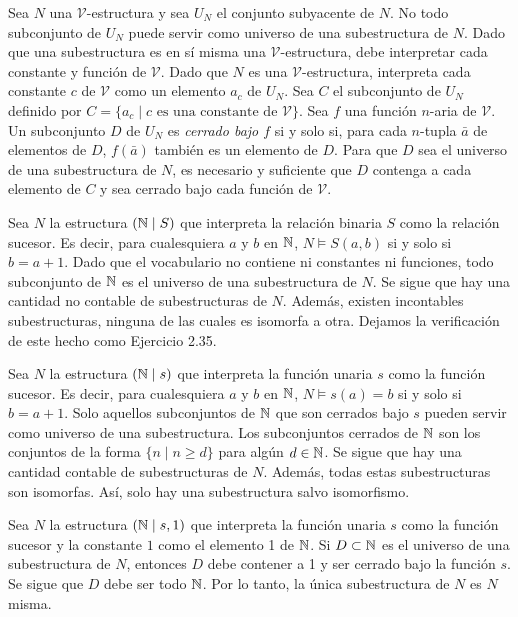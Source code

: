 \documentclass[12pt,a4paper]{book}
\newcommand{\VV}{\mathcal{V}}
\begin{document}
    Sea $N$ una $\VV$-estructura y sea $U_{N}$ el conjunto subyacente de $N$. No todo subconjunto de $U_{N}$ puede servir
    como universo de una subestructura de $N$. Dado que una subestructura es en sí misma una $\VV$-estructura, debe
    interpretar cada constante y función de $\VV$. Dado que $N$ es una $\VV$-estructura, interpreta cada constante $c$ de
    $\VV$ como un elemento $a_{c}$ de $U_{N}$. Sea $C$ el subconjunto de $U_{N}$ definido por $C=\{a_{c}\mid c\text{ es una
    constante de }\VV\}$. Sea $f$ una función $n$-aria de $\VV$. Un subconjunto $D$ de $U_{N}$ es \textit{cerrado bajo $f$}
    si y solo si, para cada $n$-tupla $\bar{a}$ de elementos de $D$, $f(\bar{a})$ también es un elemento de $D$. Para que
    $D$ sea el universo de una subestructura de $N$, es necesario y suficiente que $D$ contenga a cada elemento de $C$ y
    sea cerrado bajo cada función de $\VV$.

    \begin{ejemplo}\label{ej:subestructuras-sucesor-relacion}
        Sea $N$ la estructura $(\mathbb{N}\mid S)$ que interpreta la relación binaria $S$ como la relación sucesor. Es decir, para
        cualesquiera $a$ y $b$ en $\mathbb{N}$, $N\models S(a,b)$ si y solo si $b=a+1$. Dado que el vocabulario no contiene ni
        constantes ni funciones, todo subconjunto de $\mathbb{N}$ es el universo de una subestructura de $N$. Se sigue que hay una
        cantidad no contable de subestructuras de $N$. Además, existen incontables subestructuras, ninguna de las cuales es
        isomorfa a otra. Dejamos la verificación de este hecho como Ejercicio 2.35.
    \end{ejemplo}

    \begin{ejemplo}\label{ej:subestructuras-sucesor-funcion}
        Sea $N$ la estructura $(\mathbb{N}\mid s)$ que interpreta la función unaria $s$ como la función sucesor. Es decir, para
        cualesquiera $a$ y $b$ en $\mathbb{N}$, $N\models s(a)=b$ si y solo si $b=a+1$. Solo aquellos subconjuntos de $\mathbb{N}$ que son
        cerrados bajo $s$ pueden servir como universo de una subestructura. Los subconjuntos cerrados de $\mathbb{N}$ son los
        conjuntos de la forma $\{n\mid n\geq d\}$ para algún $d\in\mathbb{N}$. Se sigue que hay una cantidad contable de
        subestructuras de $N$. Además, todas estas subestructuras son isomorfas. Así, solo hay una subestructura salvo
        isomorfismo.
    \end{ejemplo}

    \begin{ejemplo}
        Sea $N$ la estructura $(\mathbb{N}\mid s,1)$ que interpreta la función unaria $s$ como la función sucesor y la constante
        $1$ como el elemento 1 de $\mathbb{N}$. Si $D\subset\mathbb{N}$ es el universo de una subestructura de $N$, entonces $D$ debe
        contener a 1 y ser cerrado bajo la función $s$. Se sigue que $D$ debe ser todo $\mathbb{N}$. Por lo tanto, la única
        subestructura de $N$ es $N$ misma.
    \end{ejemplo}
\end{document}
